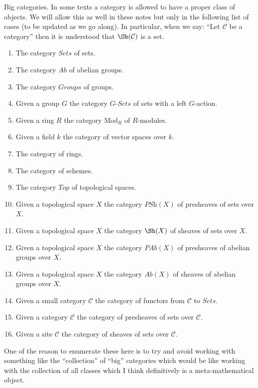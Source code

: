 \begin{remark}
\label{remark-big-categories}
Big categories. In some texts a category is allowed to have a proper
class of objects. We will allow this as well in these notes but only
in the following list of cases (to be updated as we go along).
In particular, when we say: ``Let $\mathcal{C}$ be a category''
then it is understood that $\Ob(\mathcal{C})$ is a set.
\begin{enumerate}
\item The category $\textit{Sets}$ of sets.
\item The category $\textit{Ab}$ of abelian groups.
\item The category $\textit{Groups}$ of groups.
\item Given a group $G$ the category $G\textit{-Sets}$ of
sets with a left $G$-action.
\item Given a ring $R$ the category $\text{Mod}_R$ of $R$-modules.
\item Given a field $k$ the category of vector spaces over $k$.
\item The category of rings.
\item The category of schemes.
\item The category $\textit{Top}$ of topological spaces.
\item Given a topological space $X$ the category
$\textit{PSh}(X)$ of presheaves of sets over $X$.
\item Given a topological space $X$ the category
$\Sh(X)$ of sheaves of sets over $X$.
\item Given a topological space $X$ the category
$\textit{PAb}(X)$ of presheaves of abelian groups over $X$.
\item Given a topological space $X$ the category
$\textit{Ab}(X)$ of sheaves of abelian groups over $X$.
\item Given a small category $\mathcal{C}$ the category of functors
from $\mathcal{C}$ to $\textit{Sets}$.
\item Given a category $\mathcal{C}$ the category of presheaves of sets
over $\mathcal{C}$.
\item Given a site $\mathcal{C}$ the category of sheaves
of sets over $\mathcal{C}$.
\end{enumerate}
One of the reason to enumerate these here is to try and avoid
working with something like the ``collection'' of ``big'' categories
which would be like working with the collection of all classes
which I think definitively is a meta-mathematical object.
\end{remark}

